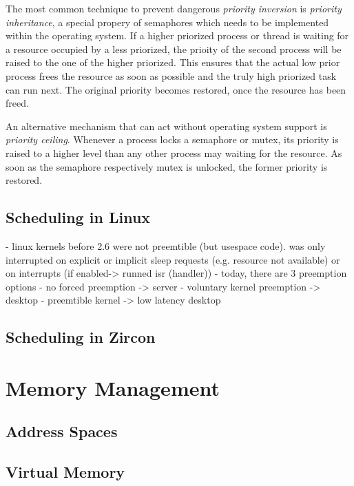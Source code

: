 The most common technique to prevent dangerous \textit{priority inversion} is \textit{priority inheritance}, a special propery of semaphores which needs to be implemented within the operating system.
If a higher priorized process or thread is waiting for a resource occupied by a less priorized, the prioity of the second process will be raised to the one of the higher priorized.
This ensures that the actual low prior process frees the resource as soon as possible and the truly high priorized task can run next.
The original priority becomes restored, once the resource has been freed\cite{glatz2015betriebssysteme}.

An alternative mechanism that can act without operating system support is \textit{priority ceiling}.
Whenever a process locks a semaphore or mutex, its priority is raised to a higher level than any other process may waiting for the resource.
As soon as the semaphore respectively mutex is unlocked, the former priority is restored\cite{glatz2015betriebssysteme}.


\subsection{Scheduling in Linux}

\cite{lfd430}
- linux kernels before 2.6 were not preemtible (but usespace code). was only interrupted on explicit or implicit sleep requests (e.g. resource not available) or on interrupts (if enabled-> runned isr (handler))
- today, there are 3 preemption options 
    - no forced preemption -> server
    - voluntary kernel preemption -> desktop
    - preemtible kernel -> low latency desktop


\subsection{Scheduling in Zircon}


\section{Memory Management} %
\subsection{Address Spaces}
\subsection{Virtual Memory}

